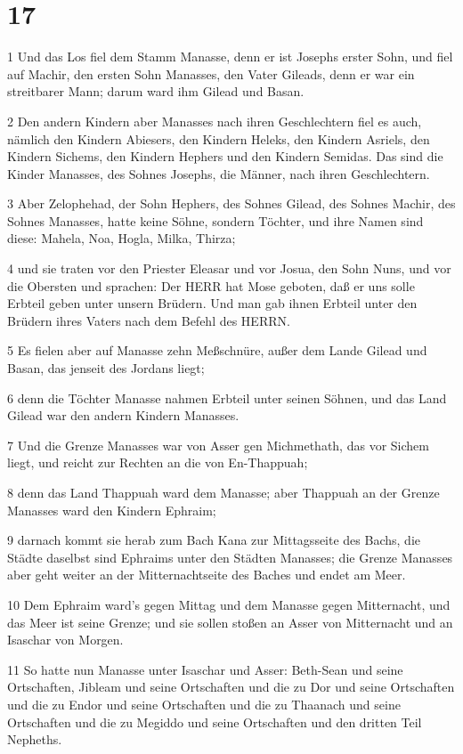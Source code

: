 \chapter{17}

\par 1 Und das Los fiel dem Stamm Manasse, denn er ist Josephs erster Sohn, und fiel auf Machir, den ersten Sohn Manasses, den Vater Gileads, denn er war ein streitbarer Mann; darum ward ihm Gilead und Basan.
\par 2 Den andern Kindern aber Manasses nach ihren Geschlechtern fiel es auch, nämlich den Kindern Abiesers, den Kindern Heleks, den Kindern Asriels, den Kindern Sichems, den Kindern Hephers und den Kindern Semidas. Das sind die Kinder Manasses, des Sohnes Josephs, die Männer, nach ihren Geschlechtern.
\par 3 Aber Zelophehad, der Sohn Hephers, des Sohnes Gilead, des Sohnes Machir, des Sohnes Manasses, hatte keine Söhne, sondern Töchter, und ihre Namen sind diese: Mahela, Noa, Hogla, Milka, Thirza;
\par 4 und sie traten vor den Priester Eleasar und vor Josua, den Sohn Nuns, und vor die Obersten und sprachen: Der HERR hat Mose geboten, daß er uns solle Erbteil geben unter unsern Brüdern. Und man gab ihnen Erbteil unter den Brüdern ihres Vaters nach dem Befehl des HERRN.
\par 5 Es fielen aber auf Manasse zehn Meßschnüre, außer dem Lande Gilead und Basan, das jenseit des Jordans liegt;
\par 6 denn die Töchter Manasse nahmen Erbteil unter seinen Söhnen, und das Land Gilead war den andern Kindern Manasses.
\par 7 Und die Grenze Manasses war von Asser gen Michmethath, das vor Sichem liegt, und reicht zur Rechten an die von En-Thappuah;
\par 8 denn das Land Thappuah ward dem Manasse; aber Thappuah an der Grenze Manasses ward den Kindern Ephraim;
\par 9 darnach kommt sie herab zum Bach Kana zur Mittagsseite des Bachs, die Städte daselbst sind Ephraims unter den Städten Manasses; die Grenze Manasses aber geht weiter an der Mitternachtseite des Baches und endet am Meer.
\par 10 Dem Ephraim ward's gegen Mittag und dem Manasse gegen Mitternacht, und das Meer ist seine Grenze; und sie sollen stoßen an Asser von Mitternacht und an Isaschar von Morgen.
\par 11 So hatte nun Manasse unter Isaschar und Asser: Beth-Sean und seine Ortschaften, Jibleam und seine Ortschaften und die zu Dor und seine Ortschaften und die zu Endor und seine Ortschaften und die zu Thaanach und seine Ortschaften und die zu Megiddo und seine Ortschaften und den dritten Teil Nepheths.
